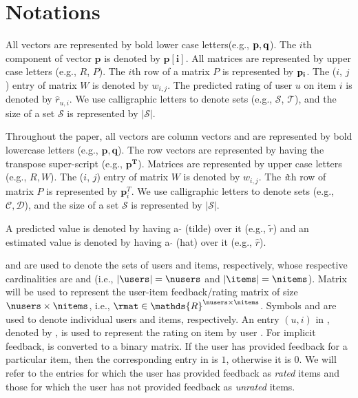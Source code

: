 \chapter{Notations}
\label{ch:notations}


All vectors are represented by bold lower case letters(e.g., $\bf{p}, \bf{q}$). The $i$th component of vector $\bm{p}$ is denoted
by $\bm{p[i]}$. All matrices are represented by upper
case letters (e.g., $R$, $P$). The $i$th row of a matrix $P$  is represented by $\bf{p_i}$. The ($i$, $j$) entry of matrix $W$ is denoted by
$w_{i,j}$.
The predicted rating of user $u$ on item $i$ is denoted by $\hat{r}_{u,i}$.
We use calligraphic letters to denote sets (e.g., $\mathcal{S}$, $\mathcal{T}$), and the size of a set $\mathcal{S}$ is represented by
$|\mathcal{S}|$.







\iffalse

Throughout the paper, all vectors are column vectors and are represented by
bold lowercase letters (e.g., $\bm{p,q}$). The row vectors are represented by
having the transpose super-script (e.g., $\bm{p^T}$). Matrices are represented by upper
case letters (e.g., ${R,W}$). The ($i$, $j$) entry of matrix $W$ is denoted by
$w_{i,j}$. The \textit{i}th row of matrix $P$ is represented by $\bm{p}_i^T$. We use calligraphic letters to denote sets (e.g.,
$\mathcal{C,D}$), and the size of a set $\mathcal{S}$ is represented by
$|\mathcal{S}|$. 
 
 
A predicted value is denoted by having a
$\mathbf{\tilde{}}$ (tilde) over it (e.g., $\tilde {r}$) and an estimated value
is denoted by having a $\mathbf{\hat{}}$ (hat) over it (e.g., $\hat {r}$).

\users and \items are used to denote the sets of users and items, respectively,
whose respective cardinalities are \nusers and \nitems (i.e., $|\users| =
\nusers$ and $|\items| = \nitems$). Matrix \rmat will be used to represent the
user-item feedback/rating matrix of size $\nusers \times \nitems$, i.e., $\rmat
\in \mathds{R}^{\nusers \times \nitems}$. Symbols \usru and \itmi are used to denote
individual users and items, respectively. An entry $(u, i)$ in \rmat, denoted by
\rui, is used to represent the rating on item \itmi by user \usru.
%
For implicit feedback, \rmat is converted to a binary matrix. If the user has
provided feedback for a particular item, then the corresponding entry in \rmat
is $1$, otherwise it is $0$. We will refer to the entries for which the user
has provided feedback as \emph{rated} items and those for which the user has
not provided feedback as \emph{unrated} items.

